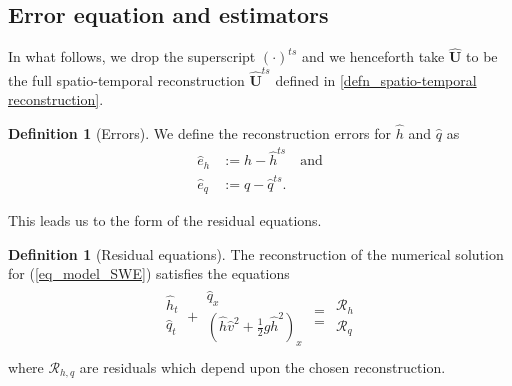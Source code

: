 \documentclass[12pt,a4paper]{article}
\numberwithin{equation}{section}
\theoremstyle{definition}
\newcommand{\vect}[1]{\textbf{#1}}
\newcommand{\qp}[1]{\left(#1\right)}
\newcommand{\rec}[1]{\widehat{{#1}}}
\newcommand{\rects}[1]{\widehat{{\vect{#1}}}^{ts}}
\newtheorem{Defn}[subsection]{Definition}
\begin{document}
\subsection{Error equation and estimators}\label{subsec_error_estimators}
In what follows, we drop the superscript $\qp{\cdot}^{ts}$ and we henceforth take $\rec{\vect{U}}$ to be the full spatio-temporal reconstruction $\rects{U}$ defined in \ref{defn_spatio-temporal reconstruction}.
\begin{Defn}[Errors]\label{defn:errors}
We define the reconstruction errors for $\rec{h}$ and $\rec{q}$ as
\begin{equation}\label{eq_err_rec_uv}
\begin{aligned}
 \widehat{e}_h&:=h- \widehat{h}^{ts} \quad \text{and}\\
 \widehat{e}_q&:=q- \widehat{q}^{ts}.
\end{aligned}
\end{equation}
\end{Defn}
This leads us to the form of the residual equations.
\begin{Defn}[Residual equations]
The reconstruction of the numerical solution for (\ref{eq_model_SWE}) satisfies the equations
\begin{equation}\label{eq_residuals}
\begin{aligned}
{\begin{array}{c}
	 \widehat{h}_t\\
	 \widehat{q}_t\\
	\end{array}
}
+
{\begin{array}{c}
	 \widehat{q}_x\\
\qp{	 \rec{h}\rec{v}^2+\frac{1}{2}g \rec{h}^2}_x
	\end{array}
}
{\begin{array}{c}
	=\\
	=
	\end{array}
}
{\begin{array}{c}
	\mathcal{R}_h\\
	\mathcal{R}_q
	\end{array}}\\
\end{aligned}
\end{equation}
where  $\mathcal{R}_{h,q}$ are residuals which depend upon the chosen reconstruction.
\end{Defn}
\end{document}
